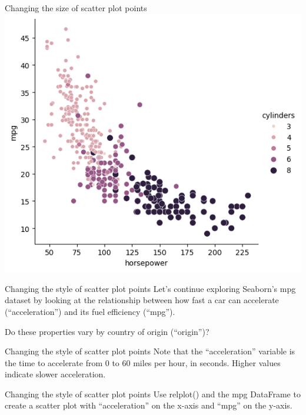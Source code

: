\documentclass[
  ignorenonframetext,
]{beamer}
\begin{document}
\begin{frame}{Changing the size of scatter plot points}
\label{changing-the-size-of-scatter-plot-points-8}
\includegraphics{../images/im269.png}
\end{frame}

\begin{frame}{Changing the style of scatter plot points}
\label{changing-the-style-of-scatter-plot-points}
Let's continue exploring Seaborn's mpg dataset by looking at the
relationship between how fast a car can accelerate (``acceleration'')
and its fuel efficiency (``mpg'').

Do these properties vary by country of origin (``origin'')?
\end{frame}

\begin{frame}{Changing the style of scatter plot points}
\label{changing-the-style-of-scatter-plot-points-1}
Note that the ``acceleration'' variable is the time to accelerate from 0
to 60 miles per hour, in seconds. Higher values indicate slower
acceleration.
\end{frame}

\begin{frame}{Changing the style of scatter plot points}
\label{changing-the-style-of-scatter-plot-points-2}
Use relplot() and the mpg DataFrame to create a scatter plot with
``acceleration'' on the x-axis and ``mpg'' on the y-axis.
\end{frame}
\end{document}
